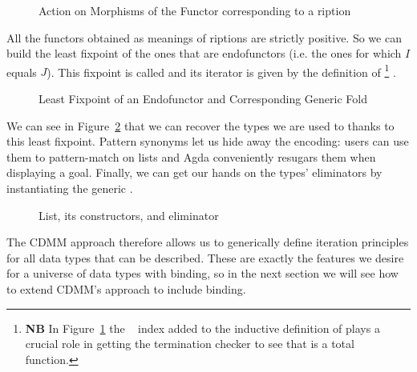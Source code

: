 \begin{figure}[h]
\caption{Action on Morphisms of the Functor corresponding to a ription}
\end{figure}

All the functors obtained as meanings of riptions are strictly
positive. So we can build the least fixpoint of the ones that are endofunctors
(i.e. the ones for which $I$ equals $J$). This fixpoint is called 
and its iterator is given by the definition of  %
\footnote{\textbf{NB}
In Figure~\ref{figure:datamu} the ~\cite{DBLP:journals/corr/abs-1012-4896} index added
to the inductive definition of  plays a crucial role in getting the
termination checker to see that  is a total function.
}
.

\begin{figure}[h]
\caption{Least Fixpoint of an Endofunctor and Corresponding Generic Fold}\label{figure:datamu}
\end{figure}

We can see in Figure~\ref{fig:list} that we can recover the types we are
used to thanks to this least fixpoint. Pattern synonyms let us hide away
the encoding: users can use them to pattern-match on lists and Agda
conveniently resugars them when displaying a goal. Finally, we can get
our hands on the types' eliminators by instantiating the generic .

\begin{figure}[h]
\begin{minipage}[t]{0.45\textwidth}
\end{minipage}
\begin{minipage}[t]{0.45\textwidth}
\end{minipage}
\caption{List, its constructors, and eliminator\label{fig:list}}
\end{figure}

The CDMM approach therefore allows us to generically define iteration principles
for all data types that can be described. These are exactly the features we desire
for a universe of data types with binding, so in the next section we will see how
to extend CDMM's approach to include binding.

